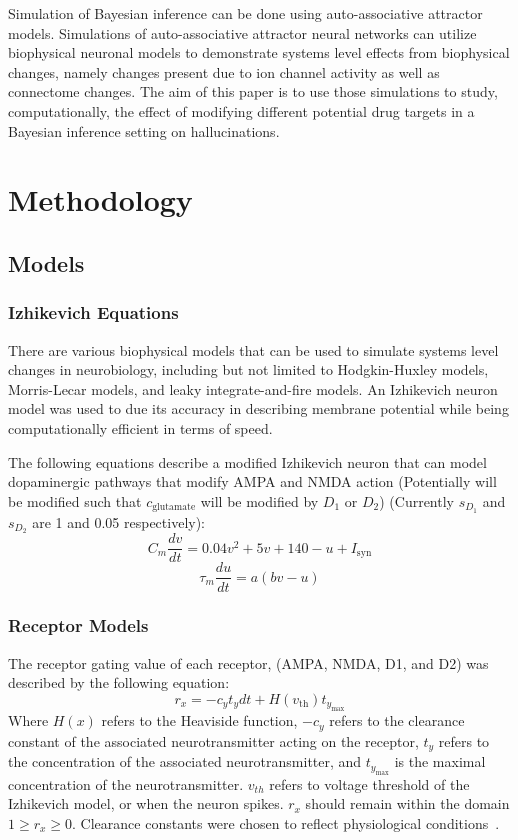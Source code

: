 \documentclass[twocolumn]{article}
\begin{document}
Simulation of Bayesian inference can be done using auto-associative attractor models. Simulations of auto-associative attractor neural networks can utilize biophysical neuronal models to demonstrate systems level effects from biophysical changes, namely changes present due to ion channel activity as well as connectome changes. The aim of this paper is to use those simulations to study, computationally, the effect of modifying different potential drug targets in a Bayesian inference setting on hallucinations.

\section{Methodology}
\subsection{Models}
\subsubsection{Izhikevich Equations}

There are various biophysical models that can be used to simulate systems level changes in neurobiology, including but not limited to Hodgkin-Huxley models, Morris-Lecar models, and leaky integrate-and-fire models. 
An Izhikevich neuron model was used to due its accuracy in describing membrane potential while being computationally efficient in terms of speed.

The following equations describe a modified Izhikevich neuron that can model dopaminergic pathways that modify AMPA and NMDA action 
(Potentially will be modified such that $c_{\mathrm{glutamate}}$ will be modified by $D_1$ or $D_2$) 
(Currently $s_{D_1}$ and $s_{D_2}$ are 1 and 0.05 respectively):
\begin{equation*}
    C_m \frac{dv}{dt} = 0.04 v^2 + 5 v + 140 - u + I_{\mathrm{syn}}
\end{equation*}
\begin{equation*}
    \tau_m \frac{du}{dt} = a (b v - u)
\end{equation*}

\subsubsection{Receptor Models}

The receptor gating value of each receptor, (AMPA, NMDA, D1, and D2) was described by the following equation:
\begin{equation*}
    r_x = -c_y t_y dt + H(v_{\mathrm{th}}) t_{y_{\max}}
\end{equation*}
Where $H(x)$ refers to the Heaviside function, $-c_y$ refers to the clearance constant of the associated neurotransmitter acting on the receptor, $t_y$ refers to the concentration of the associated neurotransmitter, and $t_{y_{\max}}$ is the maximal concentration of the neurotransmitter. 
$v_{th}$ refers to voltage threshold of the Izhikevich model, or when the neuron spikes.
$r_x$ should remain within the domain $1 \geq r_x \geq 0$.
Clearance constants were chosen to reflect physiological conditions~\cite{lippert2019time, moussawi2011extracellular}.
\end{document}
